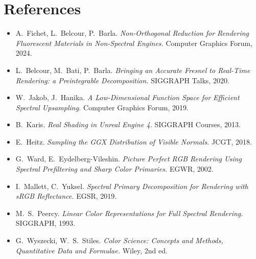 \documentclass[11pt,a4paper]{article}
\begin{document}
\section*{References}
\begin{itemize}[nosep]
  \item A.~Fichet, L.~Belcour, P.~Barla. \emph{Non-Orthogonal Reduction for
        Rendering Fluorescent Materials in Non-Spectral Engines.} Computer
        Graphics Forum, 2024.
  \item L.~Belcour, M.~Bati, P.~Barla. \emph{Bringing an Accurate Fresnel to
        Real-Time Rendering: a Preintegrable Decomposition.} SIGGRAPH Talks,
        2020.
  \item W.~Jakob, J.~Hanika. \emph{A Low-Dimensional Function Space for
        Efficient Spectral Upsampling.} Computer Graphics Forum, 2019.
  \item B.~Karis. \emph{Real Shading in Unreal Engine 4.} SIGGRAPH Courses,
        2013.
  \item E.~Heitz. \emph{Sampling the GGX Distribution of Visible Normals.}
        JCGT, 2018.
  \item G.~Ward, E.~Eydelberg-Vileshin. \emph{Picture Perfect RGB Rendering
        Using Spectral Prefiltering and Sharp Color Primaries.} EGWR, 2002.
  \item I.~Mallett, C.~Yuksel. \emph{Spectral Primary Decomposition for
        Rendering with sRGB Reflectance.} EGSR, 2019.
  \item M.~S.~Peercy. \emph{Linear Color Representations for Full Spectral
        Rendering.} SIGGRAPH, 1993.
  \item G.~Wyszecki, W.~S.~Stiles. \emph{Color Science: Concepts and Methods,
        Quantitative Data and Formulae.} Wiley, 2nd ed.
\end{itemize}
\end{document}
